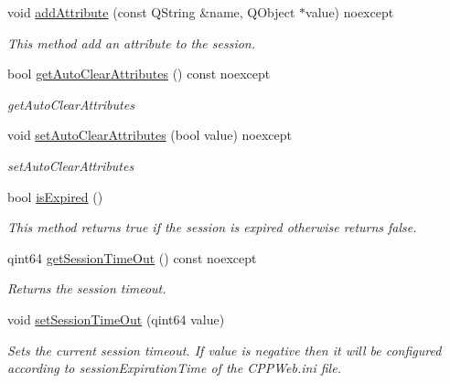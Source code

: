 \begin{DoxyCompactItemize}
void \hyperlink{class_session_afe6cfc02c901d3f27924107067f83189}{add\+Attribute} (const Q\+String \&name, Q\+Object $\ast$value) noexcept
\begin{DoxyCompactList}\small\item\em This method add an attribute to the session. \end{DoxyCompactList}\item 
\mbox{\label{class_session_a3b0c748a2347e6fbf9db640ebf552433}} 
bool \hyperlink{class_session_a3b0c748a2347e6fbf9db640ebf552433}{get\+Auto\+Clear\+Attributes} () const noexcept
\begin{DoxyCompactList}\small\item\em get\+Auto\+Clear\+Attributes \end{DoxyCompactList}\item 
\mbox{\label{class_session_af266c9e12b8bfbb89b2ba0618ebc7fd8}} 
void \hyperlink{class_session_af266c9e12b8bfbb89b2ba0618ebc7fd8}{set\+Auto\+Clear\+Attributes} (bool value) noexcept
\begin{DoxyCompactList}\small\item\em set\+Auto\+Clear\+Attributes \end{DoxyCompactList}\item 
\mbox{\label{class_session_a65cba5b1fba90e243099779ffa776a21}} 
bool \hyperlink{class_session_a65cba5b1fba90e243099779ffa776a21}{is\+Expired} ()
\begin{DoxyCompactList}\small\item\em This method returns true if the session is expired otherwise returns false. \end{DoxyCompactList}\item 
\mbox{\label{class_session_a5f8e0d9461d8d33792aa0e4d1c70d1e1}} 
qint64 \hyperlink{class_session_a5f8e0d9461d8d33792aa0e4d1c70d1e1}{get\+Session\+Time\+Out} () const noexcept
\begin{DoxyCompactList}\small\item\em Returns the session timeout. \end{DoxyCompactList}\item 
\mbox{\label{class_session_a32a0365cda15d59165b3e205ac5102c9}} 
void \hyperlink{class_session_a32a0365cda15d59165b3e205ac5102c9}{set\+Session\+Time\+Out} (qint64 value)
\begin{DoxyCompactList}\small\item\em Sets the current session timeout. If value is negative then it will be configured according to session\+Expiration\+Time of the C\+P\+P\+Web.\+ini file. \end{DoxyCompactList}\end{DoxyCompactItemize}
